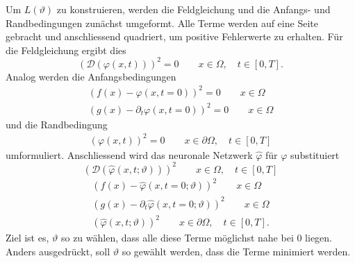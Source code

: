 Um \( L(\vartheta) \) zu konstruieren, werden die Feldgleichung und die Anfangs- und Randbedingungen zunächst umgeformt.
Alle Terme werden auf eine Seite gebracht und anschliessend quadriert, um positive Fehlerwerte zu erhalten.
Für die Feldgleichung ergibt dies
\begin{equation}
    \left(\mathcal{D}(\varphi(x, t))\right)^2 = 0 \qquad x \in \Omega, \quad t \in [0,T].
    \label{neuronal:feldgleichung_umformuliert}
\end{equation}
Analog werden die Anfangsbedingungen
\begin{equation}
    \begin{aligned}
        \left(f(x) - \varphi(x, t = 0)\right)^2 = 0 \qquad x \in \Omega\\
        \left(g(x) - \partial_t \varphi(x, t = 0)\right)^2 = 0 \qquad x \in \Omega
    \end{aligned}
    \label{neuronal:anfangsbedingung_umformuliert}
\end{equation}
und die Randbedingung
\begin{equation}
    \begin{aligned}
        \left(\varphi(x, t)\right)^2 = 0 \qquad x \in \partial \Omega, \quad t \in [0,T]
    \end{aligned}
    \label{neuronal:randbedingung_umformuliert}
\end{equation}
umformuliert.
Anschliessend wird das neuronale Netzwerk $\hat{\varphi}$ für $\varphi$ substituiert
\begin{equation}
    \left(\mathcal{D}(\hat{\varphi}(x, t; \vartheta))\right)^2 \qquad x \in \Omega, \quad t \in [0,T]
    \label{neuronal:feldgleichung_umformuliert_netz}
\end{equation}
\begin{equation}
    \begin{aligned}
        \left(f(x) - \hat{\varphi}(x, t = 0; \vartheta)\right)^2 \qquad x \in \Omega\\
        \left(g(x) - \partial_t \hat{\varphi}(x, t = 0; \vartheta)\right)^2 \qquad x \in \Omega
    \end{aligned}
    \label{neuronal:anfangsbedingung_umformuliert_netz}
\end{equation}
\begin{equation}
    \begin{aligned}
        \left(\hat{\varphi}(x, t; \vartheta)\right)^2 \qquad x \in \partial \Omega, \quad t \in [0,T].
    \end{aligned}
    \label{neuronal:randbedingung_umformuliert_netz}
\end{equation}
Ziel ist es, $\vartheta$ so zu wählen, dass alle diese Terme möglichst nahe bei 0 liegen.
Anders ausgedrückt, soll $\vartheta$ so gewählt werden, dass die Terme minimiert werden.

